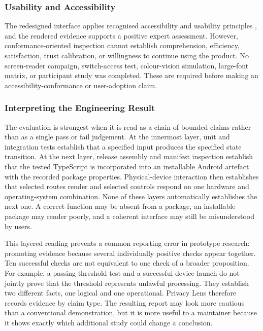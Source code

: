 \subsubsection{Usability and Accessibility}

The redesigned interface applies recognised accessibility and usability principles \cite{wcag22,androidaccess,iso924111}, and the rendered evidence supports a positive expert assessment. However, conformance-oriented inspection cannot establish comprehension, efficiency, satisfaction, trust calibration, or willingness to continue using the product. No screen-reader campaign, switch-access test, colour-vision simulation, large-font matrix, or participant study was completed. These are required before making an accessibility-conformance or user-adoption claim.

\subsubsection{Interpreting the Engineering Result}

The evaluation is strongest when it is read as a chain of bounded claims rather than as a single pass or fail judgement. At the innermost layer, unit and integration tests establish that a specified input produces the specified state transition. At the next layer, release assembly and manifest inspection establish that the tested TypeScript is incorporated into an installable Android artefact with the recorded package properties. Physical-device interaction then establishes that selected routes render and selected controls respond on one hardware and operating-system combination. None of these layers automatically establishes the next one. A correct function may be absent from a package, an installable package may render poorly, and a coherent interface may still be misunderstood by users.

This layered reading prevents a common reporting error in prototype research: promoting evidence because several individually positive checks appear together. Ten successful checks are not equivalent to one check of a broader proposition. For example, a passing threshold test and a successful device launch do not jointly prove that the threshold represents unlawful processing. They establish two different facts, one logical and one operational. Privacy Lens therefore records evidence by claim type. The resulting report may look more cautious than a conventional demonstration, but it is more useful to a maintainer because it shows exactly which additional study could change a conclusion.

